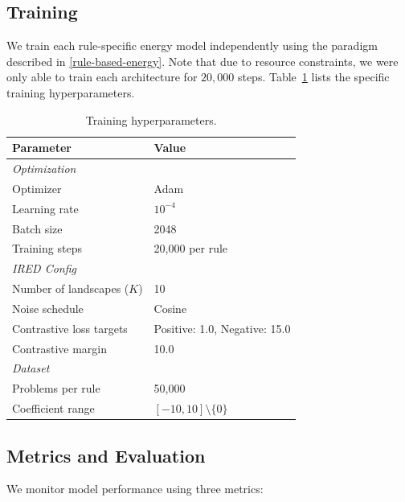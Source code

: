 \documentclass{article}
\begin{document}
\subsection{Training}

We train each rule-specific energy model independently using the paradigm described in \ref{rule-based-energy}. Note that due to resource constraints, we were only able to train each architecture for $20,000$ steps. Table~\ref{tab:training} lists the specific training hyperparameters.

\begin{table}[H]
\centering
\caption{Training hyperparameters.}
\label{tab:training}
\begin{tabular}{ll}
\toprule
\textbf{Parameter} & \textbf{Value} \\
\midrule
\multicolumn{2}{l}{\textit{Optimization}} \\
Optimizer & Adam \\
Learning rate & $10^{-4}$ \\
Batch size & 2048 \\
Training steps & 20,000 per rule \\
\midrule
\multicolumn{2}{l}{\textit{IRED Config}} \\
Number of landscapes ($K$) & 10 \\
Noise schedule & Cosine \\
Contrastive loss targets & Positive: 1.0, Negative: 15.0 \\
Contrastive margin & 10.0 \\
\midrule
\multicolumn{2}{l}{\textit{Dataset}} \\
Problems per rule & 50,000 \\
Coefficient range & $[-10, 10] \setminus \{0\}$ \\
\bottomrule
\end{tabular}
\end{table}

\subsection{Metrics and Evaluation}

We monitor model performance using three metrics:
\end{document}
